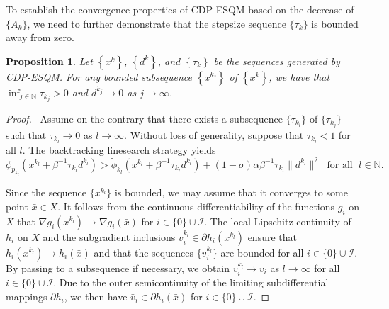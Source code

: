 \documentclass[11pt,a4paper]{article}
\newtheorem{proposition}[theorem]{Proposition}
\theoremstyle{plain}
\begin{document}
To establish the convergence properties of CDP-ESQM based on the {decrease of $\{A_k\}$}, we need to further demonstrate that the stepsize {sequence $\{\tau_k\}$} is bounded away from zero. %

\begin{proposition} \label{prop:tau-lower-bound}
Let $\left\{x^k\right\}$, $\left\{d^k\right\}$, and $\left\{\tau_k\right\}$ be the sequences generated by CDP-ESQM.
For any bounded subsequence $\left\{x^{k_j}\right\}$ of $\left\{x^k\right\}$, we have that $\inf_{j \in \mathbb{N}} \tau_{k_j} > 0$ and $d^{k_j} \rightarrow 0$ as $j\to\infty$.
\end{proposition}

\begin{proof}\,
Assume on the contrary that there exists a subsequence $\{\tau_{k_l}\}$ of $\{\tau_{k_j}\}$ such that $\tau_{k_l} \rightarrow 0$ as $l \rightarrow \infty$. Without loss of generality, suppose that $\tau_{k_l} < 1$ for all $l$.
The backtracking linesearch strategy yields 
\begin{equation}\label{violate linesearch}
\phi_{p_{k_l}}\left(x^{k_l} + \beta^{-1}\tau_{k_l} d^{k_l}\right) > \tilde\phi_{k_l}\left(x^{k_l} + \beta^{-1}\tau_{k_l} d^{k_l}\right) +  (1-\sigma)\alpha\beta^{-1}\tau_{k_l}\|d^{k_l}\|^2\;\mbox{ for all }\;l\in\mathbb N.
\end{equation}


Since the sequence $\{x^{k_l}\}$ is bounded, we may assume that it converges to some point $\bar{x}\in X$. It follows from the continuous differentiability of the functions $g_i$ on $X$ that $\nabla g_i(x^{k_l}) \to \nabla g_i(\bar{x})$ for $i \in \{0\} \cup \mathcal{I}$. The local Lipschitz continuity of $h_i$ on $X$ and the subgradient inclusions $v_i^{k_l} \in \partial h_i(x^{k_l})$ ensure that $h_i(x^{k_l}) \to h_i(\bar{x})$ and that the sequences $\{v_i^{k_l}\}$ are bounded for all $i \in \{0\} \cup \mathcal{I}$. By passing to a subsequence if necessary, we obtain $v_i^{k_l} \to \bar{v}_i$ as $l \to \infty$ for all $i \in \{0\} \cup \mathcal{I}$. Due to the outer semicontinuity of the limiting subdifferential mappings $\partial h_i$, we then have $\bar{v}_i \in \partial h_i(\bar{x})$ for $i\in
\{0\}\cup\mathcal I$.




\end{proof}
\end{document}

